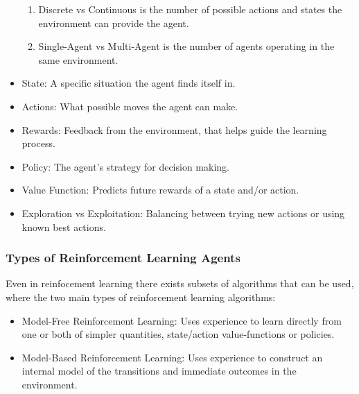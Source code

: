 \begin{itemize}
\begin{enumerate}
                  \item Discrete vs Continuous is the number of possible actions and states the environment can provide the agent.
                  \item Single-Agent vs Multi-Agent is the number of agents operating in the same environment.
            \end{enumerate}
      \item State: A specific situation the agent finds itself in.
      \item Actions: What possible moves the agent can make.
      \item Rewards: Feedback from the environment, that helps guide the learning process.
      \item Policy: The agent's strategy for decision making.
      \item Value Function: Predicts future rewards of a state and/or action.
      \item Exploration vs Exploitation: Balancing between trying new actions or using known best actions.
\end{itemize}


\subsubsection{Types of Reinforcement Learning Agents}
Even in reinfocement learning there exists subsets of algorithms that can be used, where
the two main types of reinforcement learning algorithms:
\begin{itemize}
      \item Model-Free Reinforcement Learning: Uses experience to learn directly from one or both of simpler quantities, state/action value-functions or policies.
      \item Model-Based Reinforcement Learning: Uses experience to construct an internal model of the 
      transitions and immediate outcomes in the environment.
\end{itemize}

